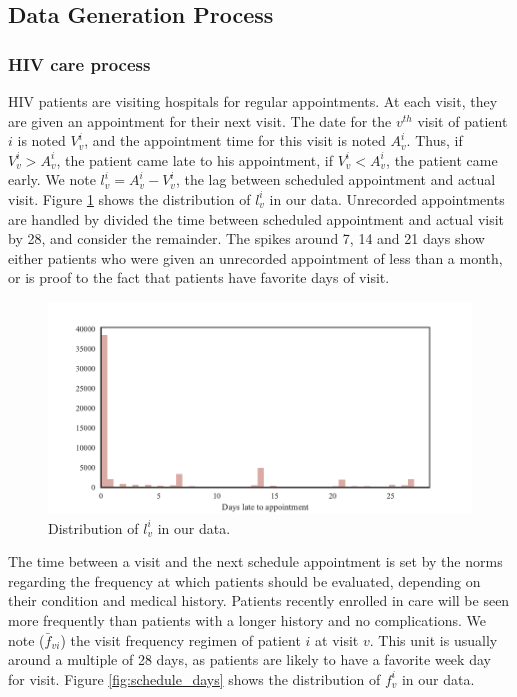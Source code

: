 \subsection{Data Generation Process}

\subsubsection{HIV care process}

HIV patients are visiting hospitals for regular appointments. At each visit, they are given an appointment for their next visit. The date for the $v^{th}$ visit of patient $i$ is noted $V_v^i$, and the appointment time for this visit is noted $A_v^i$. Thus, if $V_v^i > A_v^i$, the patient came late to his appointment, if $V_v^i < A_v^i$, the patient came early. We note $l_v^i = A_v^i - V_v^i$, the lag between scheduled appointment and actual visit. Figure \ref{fig:late_days} shows the distribution of $l_v^i$ in our data. Unrecorded appointments are handled by divided the time between scheduled appointment and actual visit by 28, and consider the remainder. The spikes around 7, 14 and 21 days show either patients who were given an unrecorded appointment of less than a month, or is proof to the fact that patients have favorite days of visit.

\begin{center}
\begin{figure}[ht]
\includegraphics[width=\textwidth]{figure/time_late_to_appointment.pdf}
\caption{Distribution of $l_v^i$ in our data.}
\label{fig:late_days}
\end{figure}
\end{center}

The time between a visit and the next schedule appointment is set by the norms regarding the frequency at which patients should be evaluated, depending on their condition and medical history. Patients recently enrolled in care will be seen more frequently than patients with a longer history and no complications. We note ($\bar{f}_{vi}$) the visit frequency regimen of patient $i$ at visit $v$. This unit is usually around a multiple of 28 days, as patients are likely to have a favorite week day for visit. Figure \ref{fig:schedule_days} shows the distribution of $f_v^i$ in our data.

